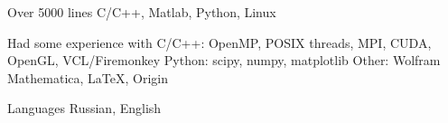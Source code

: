 

\begin{cvskills}

  \cvskill
    {Over 5000 lines} %
    {C/C++, Matlab, Python, Linux} %

  \cvskill
    {Had some experience with} %
    {\newline C/C++: OpenMP, POSIX threads, MPI, CUDA, OpenGL, VCL/Firemonkey \newline Python: scipy, numpy, matplotlib \newline Other: Wolfram Mathematica, \LaTeX, Origin \newline} %

  \cvskill
    {Languages} %
    {Russian, English} %

\end{cvskills}
